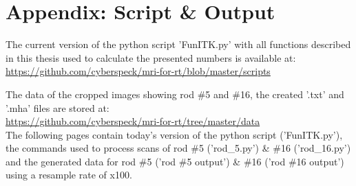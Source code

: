 \chapter*{Appendix: Script \& Output}

The current version of the python script 'FunITK.py' with all functions described in this thesis used to calculate the presented numbers is available at:\\
\url{https://github.com/cyberspeck/mri-for-rt/blob/master/scripts}

The data of the cropped images showing rod \#5 and \#16, the created '.txt' and '.mha' files are stored at: \\ \url{https://github.com/cyberspeck/mri-for-rt/tree/master/data} \\

The following pages contain today's version of the python script ('FunITK.py'), the commands used to process scans of rod \#5 ('rod\_5.py') \& \#16 ('rod\_16.py') and the generated data for rod \#5 ('rod \#5 output') \& \#16 ('rod \#16 output') using a resample rate of x100.